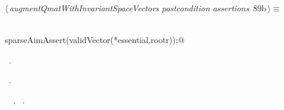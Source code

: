 \documentclass{article}
\begin{document}
\begin{flushleft} \small
\begin{minipage}{\linewidth}\label{scrap158}\raggedright\small
{} $\langle\,${\itshape augmentQmatWithInvariantSpaceVectors postcondition assertions}\nobreak\ {\footnotesize {89b}}$\,\rangle\equiv$
\vspace{-1ex}
\begin{list}{}{} \item
\mbox{}\verb@@\\
\mbox{}\verb@  sparseAimAssert(validVector(*essential,rootr));@\\
\mbox{}\verb@@{\NWsep}
\end{list}
\vspace{-1.5ex}
\footnotesize
\begin{list}{}{\setlength{\itemsep}{-\parsep}\setlength{\itemindent}{-\leftmargin}}
\item \NWtxtMacroDefBy\ .
\item \NWtxtMacroRefIn\ .
\item \NWtxtIdentsUsed\nobreak\  \verb@essential@\nobreak\ , \verb@rootr@\nobreak\ .
\item{}
\end{list}
\end{minipage}\vspace{4ex}
\end{flushleft}
\end{document}
